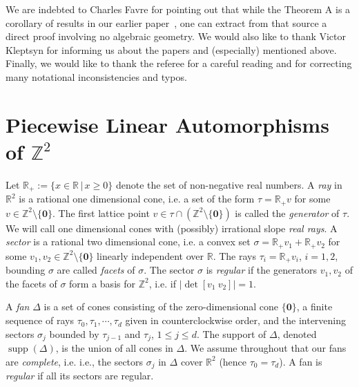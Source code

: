 \documentclass[11pt]{amsart}
\theoremstyle{definition}
\theoremstyle{plain}
\theoremstyle{remark}
\numberwithin{equation}{section}
\newcommand{\origin}{\mathbf{0}}
\DeclareMathOperator{\supp}{supp}
\def\R{\mathbb{R}}
\def\Z{\mathbb{Z}}
\def\fan{\Delta}
\begin{document}
We are indebted to Charles Favre for pointing out that while the Theorem A is a corollary of results in our earlier paper~\cite{DL}, one can extract from that source a direct proof involving no algebraic geometry.  We would also like to thank Victor Kleptsyn for informing us about the papers \cite{Li} and (especially) \cite{Cal} mentioned above.  Finally, we would like to thank the referee for a careful reading and for correcting many notational inconsistencies and typos.  


\section{Piecewise Linear Automorphisms of $\Z^2$}
\label{Sec:PL_auto}

Let $\R_+:=\{x\in\R\,|\,x\ge 0\}$ denote the set of non-negative real numbers. A {\em ray} in $\R^2$ is a rational one dimensional cone, i.e. a set of the form $\tau=\R_+ v$ for some $v\in\Z^2\setminus\{\origin\}$.  The first lattice point $v\in\tau\cap(\Z^2\setminus\{\origin\})$ is called the \emph{generator} of $\tau$.
We will call one dimensional cones with (possibly) irrational slope \emph{real rays}.  A {\em sector} is a rational two dimensional cone, i.e. a convex set
$\sigma = \R_+ v_1 + \R_+ v_2$ for some $v_1,v_2\in\Z^2\setminus\{\origin\}$ linearly independent over $\R$.  The rays $\tau_i = \R_+ v_i$, $i=1,2$, bounding $\sigma$ are called {\em facets} of $\sigma$.  The sector $\sigma$ is \emph{regular} if the generators $v_1,v_2$ of the facets of $\sigma$ form a basis for $\Z^2$, i.e. if $|\det[v_1\ v_2]|= 1$.

A \emph{fan} $\fan$ is a set of cones consisting of the zero-dimensional cone $\{\origin\}$, a finite sequence of rays $\tau_0,\tau_1,\cdots,\tau_d$ given in counterclockwise order, and the intervening sectors $\sigma_j$ bounded by $\tau_{j-1}$ and $\tau_j$, $1\leq j\leq d$.  The support of $\fan$, denoted $\supp(\fan)$, is the union of all cones in $\fan$. We assume throughout that our fans are \emph{complete}, i.e. i.e., the sectors $\sigma_j$ in $\Delta$ cover $\R^2$ (hence $\tau_0 = \tau_d$).  A fan is {\em regular} if all its sectors are regular.



%
%
\end{document}
